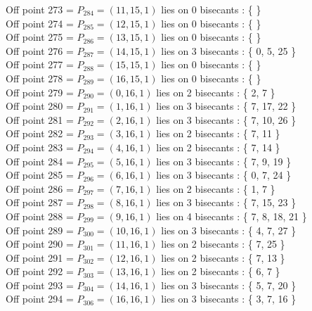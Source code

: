 \documentclass{article}
\begin{document}
{Off point 273 = $P_{284} = ( 11, 15, 1 )$ lies on 0 bisecants : \{  \}\\
Off point 274 = $P_{285} = ( 12, 15, 1 )$ lies on 0 bisecants : \{  \}\\
Off point 275 = $P_{286} = ( 13, 15, 1 )$ lies on 0 bisecants : \{  \}\\
Off point 276 = $P_{287} = ( 14, 15, 1 )$ lies on 3 bisecants : \{ 0, 5, 25 \}\\
Off point 277 = $P_{288} = ( 15, 15, 1 )$ lies on 0 bisecants : \{  \}\\
Off point 278 = $P_{289} = ( 16, 15, 1 )$ lies on 0 bisecants : \{  \}\\
Off point 279 = $P_{290} = ( 0, 16, 1 )$ lies on 2 bisecants : \{ 2, 7 \}\\
Off point 280 = $P_{291} = ( 1, 16, 1 )$ lies on 3 bisecants : \{ 7, 17, 22 \}\\
Off point 281 = $P_{292} = ( 2, 16, 1 )$ lies on 3 bisecants : \{ 7, 10, 26 \}\\
Off point 282 = $P_{293} = ( 3, 16, 1 )$ lies on 2 bisecants : \{ 7, 11 \}\\
Off point 283 = $P_{294} = ( 4, 16, 1 )$ lies on 2 bisecants : \{ 7, 14 \}\\
Off point 284 = $P_{295} = ( 5, 16, 1 )$ lies on 3 bisecants : \{ 7, 9, 19 \}\\
Off point 285 = $P_{296} = ( 6, 16, 1 )$ lies on 3 bisecants : \{ 0, 7, 24 \}\\
Off point 286 = $P_{297} = ( 7, 16, 1 )$ lies on 2 bisecants : \{ 1, 7 \}\\
Off point 287 = $P_{298} = ( 8, 16, 1 )$ lies on 3 bisecants : \{ 7, 15, 23 \}\\
Off point 288 = $P_{299} = ( 9, 16, 1 )$ lies on 4 bisecants : \{ 7, 8, 18, 21 \}\\
Off point 289 = $P_{300} = ( 10, 16, 1 )$ lies on 3 bisecants : \{ 4, 7, 27 \}\\
Off point 290 = $P_{301} = ( 11, 16, 1 )$ lies on 2 bisecants : \{ 7, 25 \}\\
Off point 291 = $P_{302} = ( 12, 16, 1 )$ lies on 2 bisecants : \{ 7, 13 \}\\
Off point 292 = $P_{303} = ( 13, 16, 1 )$ lies on 2 bisecants : \{ 6, 7 \}\\
Off point 293 = $P_{304} = ( 14, 16, 1 )$ lies on 3 bisecants : \{ 5, 7, 20 \}\\
Off point 294 = $P_{306} = ( 16, 16, 1 )$ lies on 3 bisecants : \{ 3, 7, 16 \}\\
}
\end{document}
